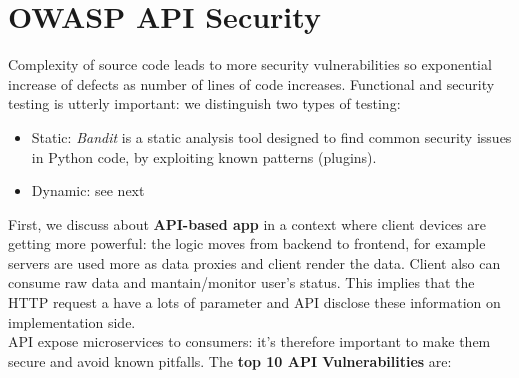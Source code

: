 \documentclass[10pt,a4paper]{report}
\begin{document}
\section{OWASP API Security}
Complexity of source code leads to more security vulnerabilities so exponential increase of defects as number of lines of code increases. Functional and security testing is utterly important: we distinguish two types of testing:
\begin{itemize}
	\item Static: \textit{Bandit} is a static analysis tool designed to find common security issues in Python code, by exploiting known patterns (plugins).
	\item Dynamic: see next
\end{itemize}
First, we discuss about \textbf{API-based app} in a context where client devices are getting more powerful: the logic moves from backend to frontend, for example servers are used more as data proxies and client render the data. Client also can consume raw data and mantain/monitor user's status. This implies that the HTTP request a have a lots of parameter and API disclose these information on implementation side. \\
API expose microservices to consumers: it's therefore important to make them secure and avoid known pitfalls. The \textbf{top 10 API Vulnerabilities} are:
\end{document}
